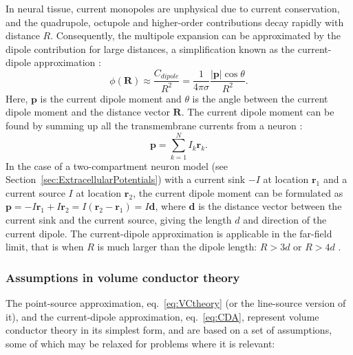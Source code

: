 \documentclass[preprint,11pt,authoryear]{elsarticle}
\begin{document}
In neural tissue, current monopoles are unphysical due to current conservation, and the quadrupole, octupole and higher-order contributions decay rapidly with distance $R$. Consequently, the multipole expansion can be approximated by the dipole contribution for large distances, a simplification known as the current-dipole approximation \citep{Nunez2006}:
\begin{equation}\label{eq:CDA}
\phi(\mathbf{R}) \approx \frac{C_{dipole}}{R^2} = \frac{1}{4 \pi \sigma} \frac{|\mathbf{p}| \cos \theta}{R^2}.
\end{equation}
Here, $\mathbf{p}$ is the current dipole moment and $\theta$ is the angle between the current dipole moment and the distance vector $\mathbf{R}$. The current dipole moment can be found by summing up all the transmembrane currents from a neuron \citep{Pettersen2008, Pettersen2014, Nunez2006}: 
\begin{equation}\label{eq:dipole}
\mathbf{p} = \sum_{k=1}^N I_k \mathbf{r}_k.
\end{equation}
In the case of a two-compartment neuron model (see Section~\ref{sec:ExtracellularPotentials}) with a current sink $-I$ at location $\mathbf{r}_1$ and a current source $I$ at location $\mathbf{r}_2$, the current dipole moment can be formulated as $\mathbf{p} = -I\mathbf{r}_1 + I\mathbf{r}_2 = I(\mathbf{r}_2 - \mathbf{r}_1) = I\mathbf{d}$, where $\mathbf{d}$ is the distance vector between the current sink and the current source, giving the length $d$ and direction of the current dipole. The current-dipole approximation is applicable in the far-field limit, that is when $R$ is much larger than the dipole length: $R > 3d$ or $R > 4d$ \citep{Nunez2006}.

\subsubsection{Assumptions in volume conductor theory}
\label{sec:VC_assumptions}
The point-source approximation, eq.~\ref{eq:VCtheory} (or the line-source version of it), and the current-dipole approximation, eq.~\eqref{eq:CDA}, represent volume conductor theory in its simplest form, and are based on a set of assumptions, some of which may be relaxed for problems where it is relevant: 
\end{document}
